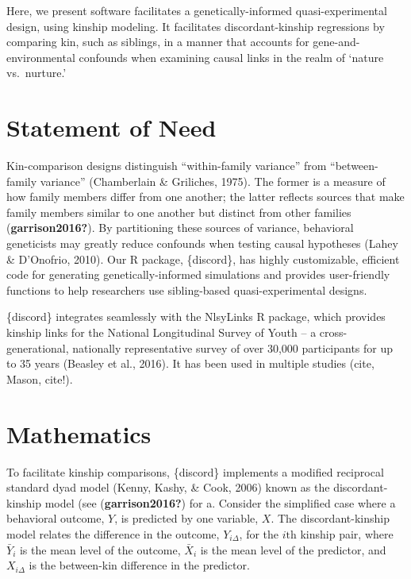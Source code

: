 \documentclass[10pt,a4paper,onecolumn]{article}
\begin{document}
Here, we present software facilitates a genetically-informed
quasi-experimental design, using kinship modeling. It facilitates
discordant-kinship regressions by comparing kin, such as siblings, in a
manner that accounts for gene-and-environmental confounds when examining
causal links in the realm of `nature vs.~nurture.'

\hypertarget{statement-of-need}{%
\section{Statement of Need}\label{statement-of-need}}

Kin-comparison designs distinguish ``within-family variance'' from
``between-family variance'' (Chamberlain \& Griliches, 1975). The former
is a measure of how family members differ from one another; the latter
reflects sources that make family members similar to one another but
distinct from other families (\textbf{garrison2016?}). By partitioning
these sources of variance, behavioral geneticists may greatly reduce
confounds when testing causal hypotheses (Lahey \& D'Onofrio, 2010). Our
R package, \{discord\}, has highly customizable, efficient code for
generating genetically-informed simulations and provides user-friendly
functions to help researchers use sibling-based quasi-experimental
designs.

\{discord\} integrates seamlessly with the NlsyLinks R package, which
provides kinship links for the National Longitudinal Survey of Youth --
a cross-generational, nationally representative survey of over 30,000
participants for up to 35 years (Beasley et al., 2016). It has been used
in multiple studies (cite, Mason, cite!).

\hypertarget{mathematics}{%
\section{Mathematics}\label{mathematics}}

To facilitate kinship comparisons, \{discord\} implements a modified
reciprocal standard dyad model (Kenny, Kashy, \& Cook, 2006) known as
the discordant-kinship model (see (\textbf{garrison2016?}) for a.
Consider the simplified case where a behavioral outcome, \(Y\), is
predicted by one variable, \(X\). The discordant-kinship model relates
the difference in the outcome, \(Y_{i\Delta}\), for the \(i\text{th}\)
kinship pair, where \(\bar{Y}_i\) is the mean level of the outcome,
\(\bar{X}_i\) is the mean level of the predictor, and \(X_{i\Delta}\) is
the between-kin difference in the predictor.
\end{document}
